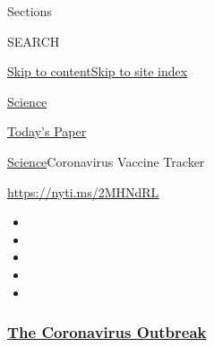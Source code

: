 Sections

SEARCH

\protect\hyperlink{site-content}{Skip to
content}\protect\hyperlink{site-index}{Skip to site index}

\href{https://www.nytimes3xbfgragh.onion/section/science}{Science}

\href{https://myaccount.nytimes3xbfgragh.onion/auth/login?response_type=cookie\&client_id=vi}{}

\href{https://www.nytimes3xbfgragh.onion/section/todayspaper}{Today's
Paper}

\href{/section/science}{Science}\textbar{}Coronavirus Vaccine Tracker

\url{https://nyti.ms/2MHNdRL}

\begin{itemize}
\item
\item
\item
\item
\item
\end{itemize}

\hypertarget{the-coronavirus-outbreak}{%
\subsubsection{\texorpdfstring{\href{https://www.nytimes3xbfgragh.onion/news-event/coronavirus?name=styln-coronavirus-national\&region=TOP_BANNER\&block=storyline_menu_recirc\&action=click\&pgtype=Interactive\&impression_id=4afd0210-f52d-11ea-8817-2db458fa0a4d\&variant=undefined}{The
Coronavirus
Outbreak}}{The Coronavirus Outbreak}}\label{the-coronavirus-outbreak}}

